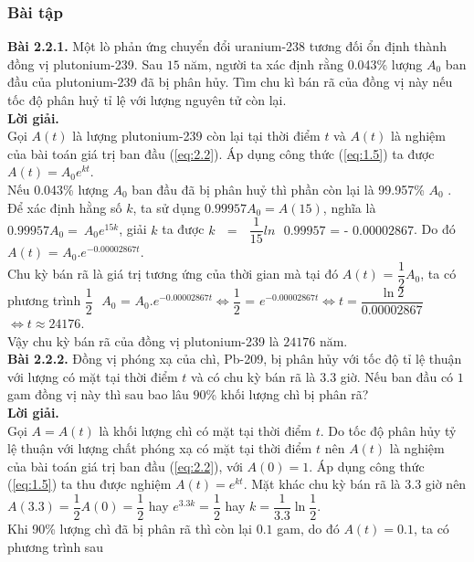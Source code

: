 \subsubsection{Bài tập}
\noindent\textbf{Bài 2.2.1.} Một lò phản ứng  chuyển đổi uranium-238 tương đối ổn định thành đồng vị plutonium-239. Sau $15$ năm, người ta xác định rằng 0.043\% lượng $A_0$ ban đầu của plutonium-239 đã bị phân hủy. Tìm chu kì bán rã của đồng vị này nếu tốc độ phân huỷ tỉ lệ với lượng nguyên tử còn lại.\\
\textbf{ Lời giải. }\\
Gọi $A(t)$ là lượng plutonium-239 còn lại tại thời điểm $t$ và  $A(t)$ là nghiệm của bài toán giá trị ban đầu (\ref{eq:2.2}). Áp dụng công thức (\ref{eq:1.5})  ta được $A(t)={{A}_{0}}{{e}^{kt}}.$\\
Nếu 0.043\% lượng $A_0$ ban đầu đã bị phân huỷ thì phần còn lại là 99.957\% $A_0$ . \\
Để xác định hằng số $k$, ta sử dụng $0.99957A_0 = A(15)$, nghĩa là $0.99957{{A}_{0}}=~{{A}_{0}}{{e}^{15k}}$, giải $k$ ta được $k\text{ }=\text{ }\dfrac{1}{15}ln\text{ }0.99957\text{ = - }0.00002867$. Do đó $A\left( t \right)\text{ = }{{A}_{0}}.{{e}^{-0.00002867t}}$.\\
    Chu kỳ bán rã là giá trị tương ứng của thời gian mà tại đó $A\left( t \right)\text{ = }\dfrac{1}{2}{{A}_{0}}$, ta có phương trình $\dfrac{1}{2}\text{ }{{A}_{0}}\text{ = }{{A}_{0}}.{{e}^{-0.00002867t}}\Leftrightarrow \dfrac{1}{2}\text{ = }{{e}^{-0.00002867t}}\Leftrightarrow t=\dfrac{\ln 2}{0.00002867}$ $\Leftrightarrow t\approx 24176.$\\
    Vậy chu kỳ bán rã của đồng vị plutonium-239 là $24176$ năm.\\
    \textbf{Bài 2.2.2.} Đồng vị phóng xạ của chì, Pb-209, bị phân hủy với tốc độ tỉ lệ thuận với lượng có mặt tại thời điểm $t$ và có chu kỳ bán rã là $3.3$ giờ. Nếu ban đầu có $1$ gam đồng vị này thì sau bao lâu  $90$\% khối lượng chì bị phân rã?\\
\textbf{    Lời giải.} \\
    Gọi $A = A(t)$ là khối lượng chì có mặt tại thời điểm $t$. Do tốc độ phân hủy tỷ lệ thuận với lượng chất phóng xạ có mặt tại thời điểm $t$ nên $A(t)$ là nghiệm của bài toán giá trị ban đầu (\ref{eq:2.2}), với $A(0)=1$. Áp dụng công thức (\ref{eq:1.5}) ta thu được nghiệm $A(t)={{e}^{kt}}$. Mặt khác chu kỳ bán rã là $3.3$ giờ nên $A(3.3)=\dfrac{1}{2}A(0)=\dfrac{1}{2}$ hay ${{e}^{3.3k}}=\dfrac{1}{2}$ hay $k=\dfrac{1}{3.3}\ln \dfrac{1}{2}.$\\
    Khi 90\% lượng chì đã bị phân rã thì còn lại $0.1$ gam, do đó $A(t) = 0.1$, ta có phương trình sau
